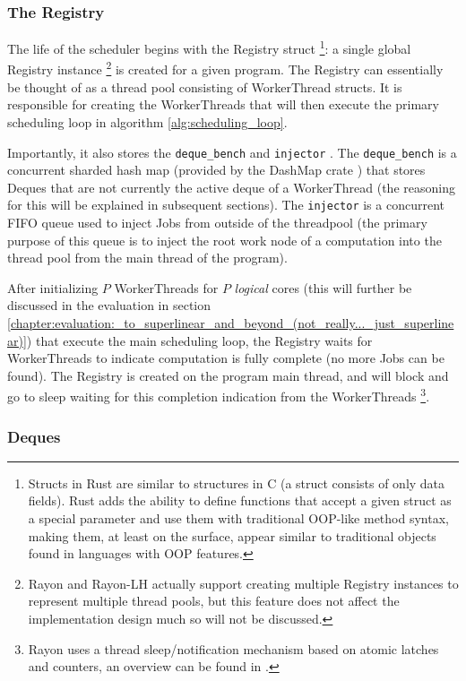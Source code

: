 \documentclass[bsc,frontabs,singlespacing,parskip,deptreport,normalheadings]{infthesis}
\begin{document}
\subsubsection*{The Registry}

The life of the scheduler begins with the Registry struct \footnote{Structs in
    Rust are similar to structures in C (a struct consists of only data fields).
    Rust adds the ability to define functions that accept a given struct as a
    special parameter and use them with traditional OOP-like method syntax,
    making them, at least on the surface, appear similar to traditional objects
    found in languages with OOP features.}: a single global Registry instance
    \footnote{Rayon and Rayon-LH actually support creating multiple Registry
    instances to represent multiple thread pools, but this feature does not
affect the implementation design much so will not be discussed.} is created for
a given program. The Registry can essentially be thought of as a thread pool
consisting of WorkerThread structs. It is responsible for creating the
WorkerThreads that will then execute the primary scheduling loop in algorithm
\ref{alg:scheduling_loop}.

Importantly, it also stores the \texttt{deque\_bench}
and \texttt{injector} . The \texttt{deque\_bench} is a concurrent sharded hash
map (provided by the DashMap crate \cite{joel_dashmap_2022}) that stores Deques
that are not currently the active deque of a WorkerThread (the reasoning for
this will be explained in subsequent sections). The \texttt{injector} is a
concurrent FIFO queue used to inject Jobs from outside of the threadpool (the
primary purpose of this queue is to inject the root work node of a computation
into the thread pool from the main thread of the program).

After initializing \(P\) WorkerThreads for \(P\) \textit{logical} cores (this
will further be discussed in the evaluation in section
\ref{chapter:evaluation:_to_superlinear_and_beyond_(not_really..._just_superlinear)})
that execute the main scheduling loop, the Registry waits for WorkerThreads to
indicate computation is fully complete (no more Jobs can be found). The Registry
is created on the program main thread, and will block and go to sleep waiting
for this completion indication from the WorkerThreads \footnote{Rayon uses a
thread sleep/notification mechanism based on atomic latches and counters, an
overview can be found in \cite{noauthor_rayon-sleep_2022}.}.

\subsubsection*{Deques}
\label{subsubsection:deque_component}
\end{document}
